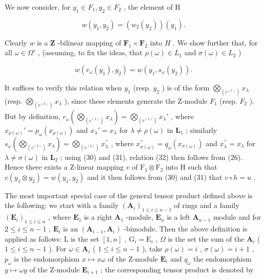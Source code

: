 We now consider, for \(y_{1} \in F_{1}, y_{2} \in F_{2}\) , the element of H

\[
w (y _ {1}, y _ {2}) = (w _ {2} (y _ {2})) (y _ {1}).\tag{31}
\]

Clearly \(w\) is a \(\mathbf{Z}\) -bilinear mapping of \(\mathbf{F}_1 \times \mathbf{F}_2\) into \(H\) . We show further that, for all \(\omega \in \Omega'\) , (assuming, to fix the ideas, that \(\rho(\omega) \in L_1\) and \(\sigma(\omega) \in L_2\) )

\[
w (r _ {\omega} (y _ {1}), y _ {2}) = w (y _ {1}, s _ {\omega} (y _ {2})).\tag{32}
\]

It suffices to verify this relation when \(y_{1}\) (resp. \(y_{2}\) ) is of the form \(\bigotimes_{(c^{(1)})} x_{\lambda}\) (resp. \(\bigotimes_{(c^{(2)})} x_{\lambda}\) ), since these elements generate the Z-module \(F_{1}\) (resp. \(F_{2}\) ). But by definition, \(r_{\omega}\left(\bigotimes_{(c^{(1)})} x_{\lambda}\right) = \bigotimes_{(c^{(1)})} x_{\lambda}'\) , where \(x_{\rho(\omega)}' = p_{\omega}(x_{\rho(\omega)})\) and \(x_{\lambda}' = x_{\lambda}\) for \(\lambda \neq \rho (\omega)\) in \(\mathbf{L}_1\) ; similarly \(s_{\omega}\left(\bigotimes_{(c^{(2)})}x_{\lambda}\right) = \bigotimes_{(c^{(2)})}x_{\lambda}^{\prime \prime}\) , where \(x_{\sigma (\omega)}^{\prime \prime} = q_{\omega}(x_{\sigma (\omega)})\) and \(x_{\lambda}^{\prime \prime} = x_{\lambda}\) for \(\lambda \neq \sigma (\omega)\) in \(\mathbf{L}_2\) ; using (30) and (31), relation (32) then follows from (26). Hence there exists a Z-linear mapping \(v\) of \(\mathrm{F}_1\otimes \mathrm{F}_2\) into H such that \(v(y_{1}\otimes y_{2}) = w(y_{1},y_{2})\) and it then follows from (30) and (31) that \(v\circ h = u\) .

The most important special case of the general tensor product defined above is the following: we start with a family \((\mathbf{A}_i)_{1\leqslant i\leqslant n - 1}\) of rings and a family \((\mathbf{E}_i)_{1\leqslant i\leqslant n}\) , where \(\mathbf{E}_1\) is a right \(\mathbf{A}_1\) -module, \(\mathbf{E}_n\) is a left \(\mathbf{A}_{n - 1}\) module and for \(2\leqslant i\leqslant n - 1\) , \(\mathbf{E}_i\) is an \((\mathbf{A}_{i - 1},\mathbf{A}_i)\) -bimodule. Then the above definition is applied as follows: L is the set \([1,n]\) , \(\mathrm{G}_i = \mathrm{E}_i\) , \(\Omega\) is the set the sum of the \(\mathbf{A}_i\) ( \(1\leqslant i\leqslant n - 1\) ). For \(\omega \in \mathbf{A}_i\) ( \(1\leqslant i\leqslant n - 1\) ), take \(\rho (\omega) = i\) , \(\sigma (\omega) = i + 1\) , \(p_{\omega}\) is the endomorphism \(x\mapsto x\omega\) of the Z-module \(\mathbf{E}_i\) and \(q_{\omega}\) the endomorphism \(y\mapsto \omega y\) of the Z-module \(\mathbf{E}_{i + 1}\) ; the corresponding tensor product is denoted by

